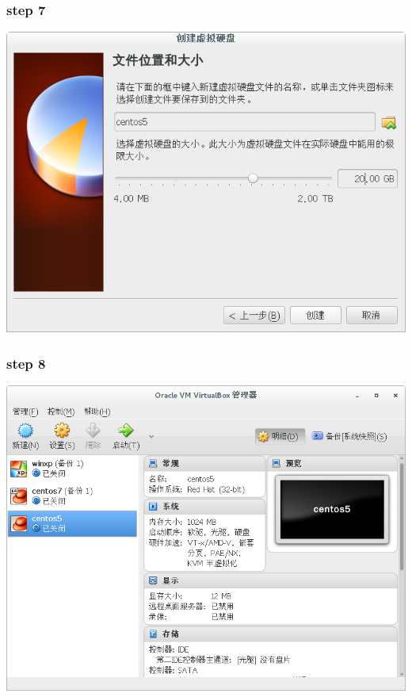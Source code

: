 \documentclass[xcolor=svgnames,presentation]{beamer}
\begin{document}
\begin{frame}
\frametitle{step 7}
\label{sec-1-7}

\begin{center}
\includegraphics[width=.9\linewidth]{img/vb09.png}
\end{center}
\end{frame}
\begin{frame}
\frametitle{step 8}
\label{sec-1-8}

\begin{center}
\includegraphics[width=.9\linewidth]{img/vb10.png}
\end{center}
\end{frame}
\end{document}
